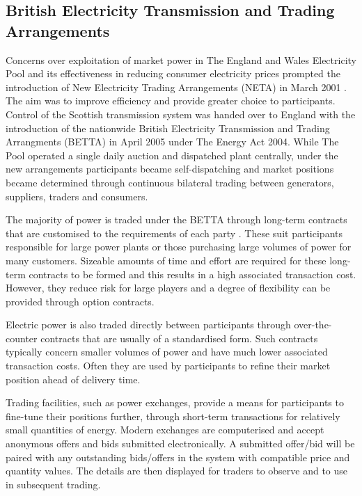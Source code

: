 \subsection{British Electricity Transmission and Trading Arrangements}
\label{sec:betta}
Concerns over exploitation of market power in The England and Wales Electricity
Pool and its effectiveness in reducing consumer electricity prices prompted the
introduction of New Electricity Trading Arrangements (NETA) in March 2001
\cite{martoccia:2005}.  The aim was to improve efficiency and provide greater
choice to participants.  Control of the Scottish transmission system was
handed over to England with the introduction of the nationwide British
Electricity Transmission and Trading Arrangments (BETTA) in April 2005 under The Energy
Act 2004.  While The Pool operated a single daily auction and dispatched plant
centrally, under the new arrangements participants became self-dispatching and
market positions became determined through continuous bilateral trading
between generators, suppliers, traders and consumers.

The majority of power is traded under the BETTA through long-term contracts
that are customised to the requirements of each party \cite{kirschen:book}.
These suit participants responsible for large power plants or those purchasing
large volumes of power for many customers.  Sizeable amounts of time and
effort are required for these long-term contracts to be formed and this results
in a high associated transaction cost.  However, they reduce risk for large
players and a degree of flexibility can be provided through option contracts.

Electric power is also traded directly between participants through
over-the-counter contracts that are usually of a standardised form.  Such contracts
typically concern smaller volumes of power and have much lower associated
transaction costs.  Often they are used by participants to refine their market
position ahead of delivery time.

Trading facilities, such as power exchanges, provide a means for participants
to fine-tune their positions further, through short-term transactions for
relatively small quantities of energy.  Modern exchanges are computerised and
accept anonymous offers and bids submitted electronically.  A submitted
offer/bid will be paired with any outstanding bids/offers in the system with
compatible price and quantity values.  The details are then displayed for
traders to observe and to use in subsequent trading.

